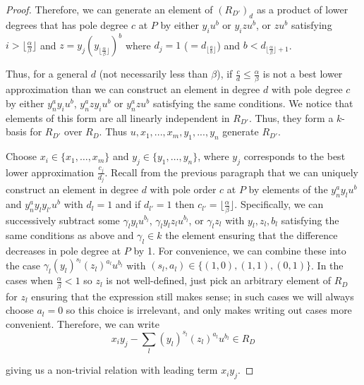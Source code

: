 \documentclass{amsart}
\theoremstyle{plain}
\theoremstyle{definition}
\theoremstyle{remark}
\numberwithin{equation}{section}
\begin{document}
\begin{proof}
\noindent
Therefore, we can generate an element of $(R_{D'})_d$ as a product of lower degrees that 
has pole degree $c$ at $P$ by either $y_i u^b$ or $y_i z u^b$, or $zu^b$ satisfying $i>
\lfloor \frac{\alpha}{\beta} \rfloor$ and $z=y_j (y_{\lfloor \frac{\alpha}{\beta} \rfloor})^b$ 
where $d_j=1$ ($=d_{{\lfloor \frac{a}{b} \rfloor}}$) and $b<d_{\lfloor \frac{\alpha}{\beta} 
\rfloor + 1}$.

Thus, for a general $d$ (not necessarily less than $\beta$), if $\frac{c}{d} \le
\frac{\alpha}{\beta}$ is not a best lower approximation than we can
construct an element in degree $d$ with pole degree $c$ by either $y
_n^a y_i u^b$, $y_n^a zy_iu^b$ or $y_n^a z u^b$ satisfying the
same conditions.  We notice that elements of this form are all
linearly independent in $R_{D'}$.  Thus, they form a $k$-basis for
$R_{D'}$ over $R_D$.  Thus $u, x_1, ..., x_m, y_1, ..., y_n$ generate
$R_{D'}$.

Choose $x_i\in \{x_1, \ldots, x_m\}$ and $y_j\in \{y_1, \ldots, y_n\}$, where $y_j$ 
corresponds to the best lower approximation $\frac{c_j}{d_j}$.  Recall from the previous 
paragraph that we can uniquely construct an element in degree $d$ with pole order $c$ at 
$P$ by elements of the $y_n^a y_l u^b$ and $y_n^a y_l y_{l'} u^b$ with $d_l=1$ and if 
$d_{l'}=1$ then $c_{l'} = \lfloor \frac{\alpha}{\beta} \rfloor$.  Specifically, we can 
successively subtract some $\gamma_l y_l u^{b_l}$, $\gamma_l y_l z_l u^{b_l}$, or $
\gamma_l z_l$ with $y_l, z_l, b_l$ satisfying the same conditions as above and $\gamma_l
\in k$ the element ensuring that the difference decreases in pole degree at $P$ by 1.  For 
convenience, we can combine these into the case $\gamma_l (y_l)^{s_l}(z_l)^{a_l}u^{b_l}$ 
with $(s_l,a_l)\in \{(1,0),(1,1),(0,1)\}$.  In the cases when $\frac{\alpha}{\beta}<1$ so $z_l$ 
is not well-defined, just pick an arbitrary element of $R_D$ for $z_l$ ensuring that the 
expression still makes sense; in such cases we will always choose $a_l=0$ so this choice 
is irrelevant, and only makes writing out cases more convenient.  Therefore, we can write
\[
	x_i y_j - \sum_{l} (y_l)^{s_l} (z_l)^{a_l} u^{b_l}\in R_D
\]

\noindent
giving us a non-trivial relation with leading term $x_iy_j$. 


\end{proof}
\end{document}
